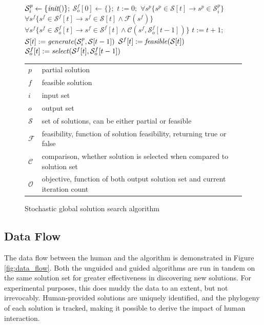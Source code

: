 \begin{figure}
  \begin{algorithmic}
    \STATE $\mathcal{S}^p_i \leftarrow \{\emph{init}()\};$
    \STATE $\mathcal{S}^f_o[0] \leftarrow \{\};$
    \STATE $t := 0;$
    \ENSURE $\forall s^p \{s^p \in \mathcal{S}[t] \rightarrow s^p \in \mathcal{S}^p_i\}$
    \ENSURE $\forall s^f \{s^f \in \mathcal{S}^f[t] \rightarrow s^f \in \mathcal{S}[t] \wedge \mathcal{F}(s^f)\}$
    \ENSURE $\forall s^f \{s^f \in \mathcal{S}^f_o[t] \rightarrow s^f \in \mathcal{S}^f[t] \wedge \mathcal{C}(s^f, \mathcal{S}^f_o[t - 1])\}$
    \STATE $t := t + 1;$
    \STATE $\mathcal{S}[t] := \mbox{\emph{generate}}(\mathcal{S}^p_i,\mathcal{S}[t-1])$
    \STATE $\mathcal{S}^f[t] := \mbox{\emph{feasible}}(\mathcal{S}[t])$
    \STATE $\mathcal{S}^f_o[t] := \mbox{\emph{select}}(\mathcal{S}^f[t], \mathcal{S}^f_o[t-1])$
    \ENDWHILE
  \end{algorithmic}
  \begin{tabular}{|l|l|}
  \hline
    $p$ & partial solution \\
    $f$ & feasible solution \\
    $i$ & input set \\
    $o$ & output set \\
    $\mathcal{S}$ & set of solutions, can be either partial or feasible \\
    $\mathcal{F}$ & feasibility, function of solution feasibility, returning true or false \\
    $\mathcal{C}$ & comparison, whether solution is selected when compared to solution set \\
    $\mathcal{O}$ & objective, function of both output solution set and current iteration count \\
  \hline
  \end{tabular}
\caption{Stochastic global solution search algorithm}
\label{fig:stochastic_global_solution_search}
\end{figure}


\subsection{Data Flow}
The data flow between the human and the algorithm is demonstrated in Figure \ref{fig:data_flow}.  Both the unguided and guided algorithms are run in tandem on the same solution set for greater effectiveness in discovering new solutions.  For experimental purposes, this does muddy the data to an extent, but not irrevocably.  Human-provided solutions are uniquely identified, and the phylogeny of each solution is tracked, making it possible to derive the impact of human interaction.  

